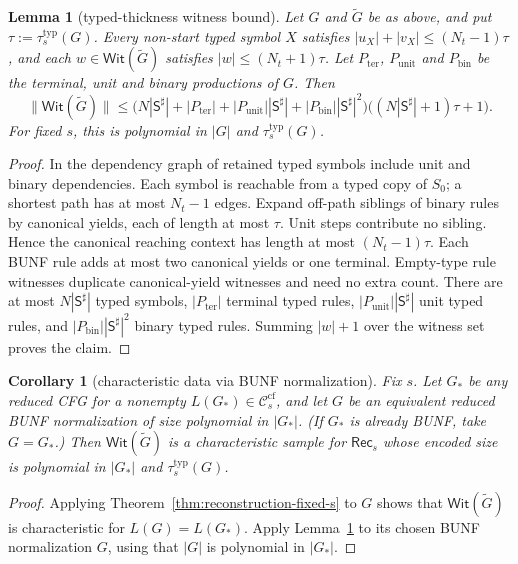 \documentclass[11pt,a4paper]{article}
\newtheorem{lemma}[theorem]{Lemma}
\newtheorem{corollary}[theorem]{Corollary}
\theoremstyle{remark}
\theoremstyle{plain}
\newcommand{\WitnessSet}{\mathsf{Wit}}
\newcommand{\cf}{\mathrm{cf}}
\newcommand{\Ccf}[1]{\mathcal C_{#1}^{\cf}}
\begin{document}
\begin{lemma}[typed-thickness witness bound]
\label{lem:typed-thickness-bound}
Let $G$ and $\widetilde G$ be as above, and put
$\tau:=\tau_s^{\mathrm{typ}}(G)$.
Every non-start typed symbol $X$ satisfies
$|u_X|+|v_X|\le(N_t-1)\tau$, and each
$w\in\WitnessSet(\widetilde G)$ satisfies
$|w|\le(N_t+1)\tau$.
Let $P_{\mathrm{ter}}$, $P_{\mathrm{unit}}$ and
$P_{\mathrm{bin}}$ be the terminal, unit and binary
productions of $G$.  Then
\[
\|\WitnessSet(\widetilde G)\|
\le\bigl(N|\mathsf S^\sharp|+|P_{\mathrm{ter}}|
 +|P_{\mathrm{unit}}||\mathsf S^\sharp|
 +|P_{\mathrm{bin}}||\mathsf S^\sharp|^2\bigr)
 \bigl((N|\mathsf S^\sharp|+1)\tau+1\bigr).
\]
For fixed $s$, this is polynomial in $|G|$ and
$\tau_s^{\mathrm{typ}}(G)$.
\end{lemma}
\begin{proof}
In the dependency graph of retained typed symbols
include unit and binary dependencies.  Each symbol
is reachable from a typed copy of $S_0$; a shortest
path has at most $N_t-1$ edges.  Expand off-path
siblings of binary rules by canonical yields,
each of length at most $\tau$.  Unit steps contribute
no sibling.  Hence the canonical reaching context has
length at most $(N_t-1)\tau$.
Each BUNF rule adds at most two canonical yields or
one terminal.  Empty-type rule witnesses duplicate
canonical-yield witnesses and need no extra count.
There are at most $N|\mathsf S^\sharp|$ typed symbols,
$|P_{\mathrm{ter}}|$ terminal typed rules,
$|P_{\mathrm{unit}}||\mathsf S^\sharp|$ unit typed rules, and
$|P_{\mathrm{bin}}||\mathsf S^\sharp|^2$ binary typed rules.
Summing $|w|+1$ over the witness set proves the claim.
\end{proof}

\begin{corollary}[characteristic data via BUNF normalization]
\label{cor:typed-thickness-data}
Fix $s$.  Let $G_*$ be any reduced CFG for a nonempty
$L(G_*)\in\Ccf{s}$, and let $G$ be an equivalent reduced
BUNF normalization of size polynomial in $|G_*|$.
(If $G_*$ is already BUNF, take $G=G_*$.)
Then $\WitnessSet(\widetilde G)$ is a characteristic sample
for $\mathsf{Rec}_s$ whose encoded size is polynomial in
$|G_*|$ and $\tau_s^{\mathrm{typ}}(G)$.
\end{corollary}

\begin{proof}
Applying Theorem~\ref{thm:reconstruction-fixed-s} to $G$
shows that $\WitnessSet(\widetilde G)$ is characteristic
for $L(G)=L(G_*)$.
Apply Lemma~\ref{lem:typed-thickness-bound} to its chosen
BUNF normalization $G$, using that $|G|$ is polynomial
in $|G_*|$.
\end{proof}
\end{document}
